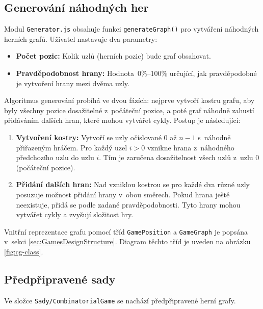 \subsection{Generování náhodných her}
\label{sec:GamesGenerationImpl}

Modul \texttt{Generator.js} obsahuje funkci \texttt{generateGraph()} pro vytváření náhodných herních grafů. Uživatel nastavuje dva parametry:

\begin{itemize}
    \item \textbf{Počet pozic:} Kolik uzlů (herních pozic) bude graf obsahovat.
    \item \textbf{Pravděpodobnost hrany:} Hodnota~0\%--100\% určující, jak pravděpodobné je vytvoření hrany mezi dvěma uzly.
\end{itemize}

Algoritmus generování probíhá ve dvou fázích: nejprve vytvoří kostru grafu, aby byly všechny pozice dosažitelné z~počáteční pozice, a poté graf náhodně zahustí přidáváním dalších hran, které mohou vytvářet cykly. Postup je následující:

\begin{enumerate}
    \item \textbf{Vytvoření kostry:} Vytvoří se uzly očíslované 0 až \( n-1 \) s~náhodně přiřazeným hráčem. Pro každý uzel \( i > 0 \) vznikne hrana z~náhodného předchozího uzlu do uzlu \( i \). Tím je zaručena dosažitelnost všech uzlů z~uzlu 0 (počáteční pozice).
    
    \item \textbf{Přidání dalších hran:} Nad vzniklou kostrou se pro každé dva různé uzly posuzuje možnost přidání hrany v~obou směrech. Pokud hrana ještě neexistuje, přidá se podle zadané pravděpodobnosti. Tyto hrany mohou vytvářet cykly a zvyšují složitost hry.
\end{enumerate}

Vnitřní reprezentace grafu pomocí tříd \texttt{GamePosition} a \texttt{GameGraph} je popsána v~sekci \ref{sec:GamesDesignStructure}. Diagram těchto tříd je uveden na obrázku \ref{fig:cg-class}.

\subsection{Předpřipravené sady}
\label{sec:GamesPreparedSetsImpl}

Ve složce \texttt{Sady/CombinatorialGame} se nachází předpřipravené herní grafy.

